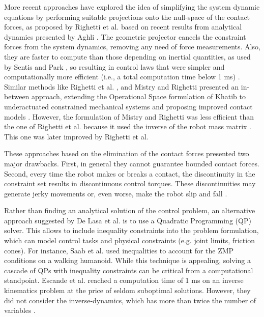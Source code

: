 	More recent approaches have explored the idea of simplifying the system dynamic equations by performing
	suitable projections onto the null-space of the contact forces, as proposed by Righetti et al.
	\cite{Righetti_Humanoids2011} based on recent results from analytical dynamics presented by Aghli
	\cite{Aghili_TransRobotics2005}.
	The geometric projector cancels the constraint forces from the system dynamics, removing any need
	of force measurements.
	Also, they are faster to compute than those depending on inertial quantities, as used by Sentis
	\cite{Sentis_PhDThesis2007} and Park \cite{Park_PhDThesis2006}, so resulting in control laws that were
	simpler and computationally more efficient (i.e., a total computation time below 1 ms)
	\cite{DelPrete_IROS2014} \cite{Nori_FrontRobAI2015}.
	Similar methods like Righetti et al. \cite{Righetti_ICRA2011}, and Mistry and Righetti
	\cite{Mistry_RSS2011} presented an in-between approach, extending the	Operational Space formulation
	of Khatib \cite{Khatib_RoboticsAuto1987} to underactuated constrained mechanical systems and proposing
	improved contact models \cite{DelPrete_IROS2014} \cite{Moro_IJHR2016}.
	However, the formulation of Mistry and Righetti	\cite{Mistry_RSS2011} was less efficient than the one
	of Righetti et al. \cite{Righetti_ICRA2011} because it used the inverse of the robot mass matrix
	\cite{DelPrete_IROS2014}.
	This one was later improved by Righetti et al. \cite{Righetti_IJRR2013}
	
	These approaches based on the elimination of the contact forces presented two major drawbacks.
	First, in general they cannot guarantee bounded contact forces.
	Second, every time the robot makes or breaks a contact, the discontinuity in the constraint set
	results in discontinuous control torques.
	These discontinuities may generate jerky movements or, even worse, make the robot slip and fall
	\cite{DelPrete_IROS2014}.
	
	Rather than finding an analytical solution of the control problem, an alternative approach suggested
	by De Lasa et al. \cite{DeLasa_IROS2009} is to use a Quadratic Programming (QP) solver.
	This allows to include inequality constraints into the problem formulation, which can model
	control tasks and physical constraints (e.g. joint limits, friction cones).
	For instance, Saab et al. \cite{Saab_ICRA2011} \cite{Saab_IROS2011} \cite{Saab_TransRobotics2013}
	used inequalities to account for the ZMP conditions on a walking humanoid.
	While this technique is appealing, solving a cascade of QPs with inequality constraints can be critical
	from a computational standpoint.
	Escande et al. \cite{Escande_IJRR2014} reached a computation time of 1 ms on an inverse kinematics
	problem at the price of seldom suboptimal solutions.
	However, they did not consider the inverse-dynamics, which has more than twice the number of variables
	\cite{DelPrete_IROS2014}.
	
